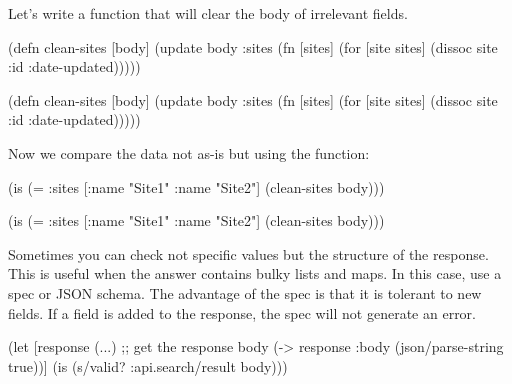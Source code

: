 \noindent
Let's write a function that will clear the body of irrelevant fields.

\ifx\DEVICETYPE\MOBILE

\begin{english}
  \begin{clojure}
(defn clean-sites [body]
 (update body :sites
  (fn [sites]
   (for [site sites]
    (dissoc site :id :date-updated)))))
  \end{clojure}
\end{english}

\else

\begin{english}
  \begin{clojure}
(defn clean-sites [body]
  (update body :sites
          (fn [sites]
            (for [site sites]
              (dissoc site :id :date-updated)))))
  \end{clojure}
\end{english}

\fi

\noindent
Now we compare the data not as-is but using the function:

\ifx\DEVICETYPE\MOBILE

\begin{english}
  \begin{clojure}
(is (= {:sites [{:name "Site1"}
                {:name "Site2"}]}
       (clean-sites body)))
  \end{clojure}
\end{english}

\else

\begin{english}
  \begin{clojure}
(is (= {:sites [{:name "Site1"} {:name "Site2"}]}
       (clean-sites body)))
  \end{clojure}
\end{english}

\fi

Sometimes you can check not specific values but the structure of the response. This is useful when the answer contains bulky lists and maps. In this case, use a spec or JSON schema. The advantage of the spec is that it is tolerant to new fields. If a field is added to the response, the spec will not generate an error.


\ifx\DEVICETYPE\MOBILE

\begin{english}
  \begin{clojure}
(let [response (...) ;; get the response
      body (-> response
               :body
               (json/parse-string
                 true))]
  (is (s/valid? :api.search/result
                body)))
  \end{clojure}
\end{english}

